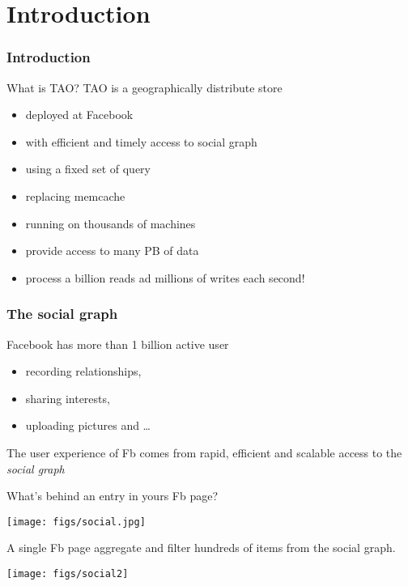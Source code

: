 
\setlength{\parskip}{\baselineskip} 
\section*{Introduction}
\begin{frame}[t]
\frametitle{Introduction}
\begin{block}{What is TAO?}
	TAO is a geographically distribute store
	\begin{itemize}
		\item deployed at Facebook
	 	\item with efficient and timely access to social graph
	 	\item using a fixed set of query
	 	\item replacing memcache
	 	\item running on thousands of machines
	 	\item provide access to many PB of data
	 	\item process a billion reads ad millions of writes each second!
	 \end{itemize} 
\end{block}
\end{frame}

\begin{frame}
\frametitle{The social graph}
Facebook has more than 1 billion active user 
\begin{itemize}
	\item recording relationships,
	\item sharing interests,
	\item uploading pictures and \dots
\end{itemize}

The user experience of Fb comes from rapid, efficient and scalable access to the \emph{social graph}
\end{frame}

\begin{frame}
	What's behind an entry in yours Fb page?

	\begin{center}
	\texttt{[image: figs/social.jpg]}	\\
	\end{center}
	A single Fb page aggregate and filter hundreds of items from the social graph.
\end{frame}%

\begin{frame}[t]
\begin{center}
\texttt{[image: figs/social2]}	
\end{center}


\end{frame}

